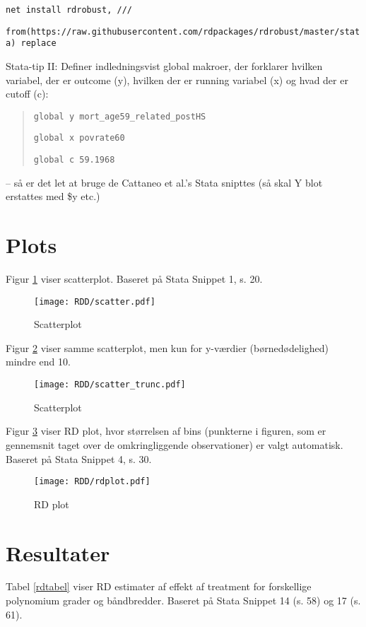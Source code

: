 \documentclass[12pt]{article}
\begin{document}
\noindent \verb|net install rdrobust, /// |

\noindent \verb|from(https://raw.githubusercontent.com/rdpackages/rdrobust/master/stata) replace|

Stata-tip II: Definer indledningsvist global makroer, der forklarer hvilken variabel, der er outcome (y), hvilken der er running variabel (x) og hvad der er cutoff (c):
\begin{quote}
\verb|global y mort_age59_related_postHS|

\verb|global x povrate60|

\verb|global c 59.1968|
\end{quote}
\indent -- så er det let at bruge de Cattaneo et al.'s Stata snipttes (så skal Y blot erstattes med \$y etc.) 

\section*{Plots}

Figur \ref{scatter} viser scatterplot. Baseret på Stata Snippet 1, s. 20.


\begin{figure}
\caption{Scatterplot} \label{scatter}
\texttt{[image: RDD/scatter.pdf]}
\end{figure}

Figur \ref{scatter_trunc} viser samme scatterplot, men kun for y-værdier (børnedødelighed) mindre end 10.


\begin{figure}
\caption{Scatterplot} \label{scatter_trunc}
\texttt{[image: RDD/scatter\_trunc.pdf]}
\end{figure}

Figur \ref{rdplot} viser RD plot, hvor størrelsen af bins (punkterne i figuren, som er gennemsnit taget over de omkringliggende observationer) er valgt automatisk. Baseret på Stata Snippet 4, s. 30.



\begin{figure}
\caption{RD plot} \label{rdplot}
\texttt{[image: RDD/rdplot.pdf]}
\end{figure}


\section*{Resultater}

Tabel \ref{rdtabel} viser RD estimater af effekt af treatment for forskellige polynomium grader og båndbredder. Baseret på Stata Snippet 14 (s. 58) og 17 (s. 61).
\end{document}

